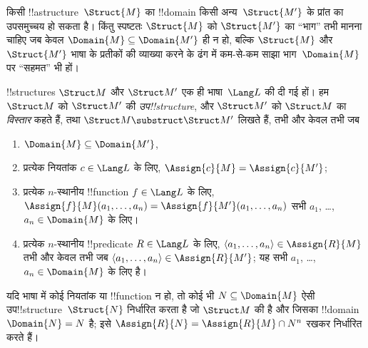 \documentclass[../../../include/open-logic-section]{subfiles}
\begin{document}

किसी !!a{structure}~$\Struct{M}$ का !!{domain} किसी अन्य~$\Struct{M'}$ के
प्रांत का उपसमुच्चय हो सकता है। किंतु स्पष्टतः $\Struct{M}$ को
$\Struct{M'}$ का ``भाग'' तभी मानना चाहिए जब केवल $\Domain{M}
\subseteq \Domain{M'}$ ही न हो, बल्कि $\Struct{M}$ और $\Struct{M'}$ भाषा
के प्रतीकों की व्याख्या करने के ढंग में कम-से-कम साझा भाग~$\Domain{M}$ पर
``सहमत'' भी हों।

\begin{defn}
!!{structure}s $\Struct M$ और $\Struct M'$ एक ही भाषा~$\Lang L$ की दी गई
हों। हम $\Struct M$ को $\Struct M'$ की \emph{उप!!{structure}}, और $\Struct M'$
को $\Struct M$ का \emph{विस्तार} कहते हैं, तथा $\Struct M \substruct \Struct M'$
लिखते हैं, तभी और केवल तभी जब
\begin{enumerate}
\item $\Domain{M} \subseteq \Domain{M'}$,
\item प्रत्येक नियतांक $c \in \Lang L$ के लिए, $\Assign{c}{M} =
    \Assign{c}{M'}$;
\item प्रत्येक $n$-स्थानीय !!{function} $f \in \Lang L$ के लिए,
  $\Assign{f}{M}(a_1, \dots, a_n) = \Assign{f}{M'}(a_1, \dots, a_n)$
  सभी $a_1$, \dots, $a_n \in \Domain{M}$ के लिए।
\item प्रत्येक $n$-स्थानीय !!{predicate} $R \in \Lang L$ के लिए, $\langle
  a_1, \dots, a_n\rangle \in \Assign{R}{M}$ तभी और केवल तभी जब $\langle a_1, \dots,
  a_n\rangle \in \Assign{R}{M'}$; यह सभी $a_1$, \dots, $a_n \in
  \Domain{M}$ के लिए है।
\end{enumerate}
\end{defn}

\begin{rem}
यदि भाषा में कोई नियतांक या !!{function} न हो, तो कोई भी $N
\subseteq \Domain{M}$ ऐसी उप!!{structure}~$\Struct{N}$ निर्धारित करता है
जो $\Struct M$ की है और जिसका !!{domain}~$\Domain{N} = N$ है; इसे
$\Assign{R}{N} =
\Assign{R}{M} \cap N^n$ रखकर निर्धारित करते हैं।
\end{rem}

\end{document}
